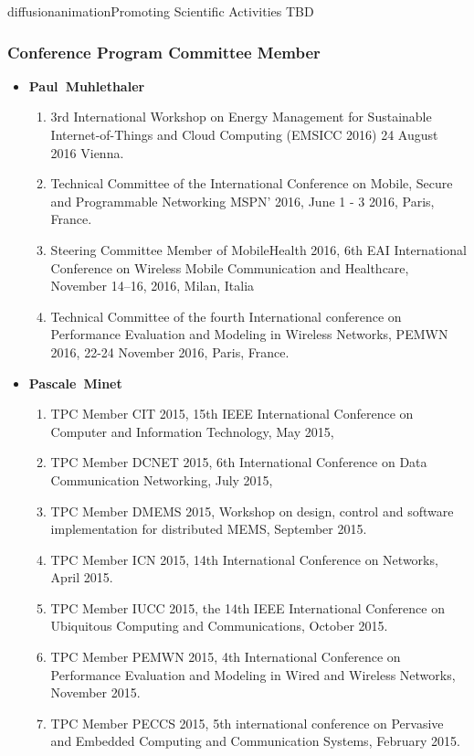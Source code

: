 \documentclass{ra2016}
\newcommand{\paul}  {\textbf{Paul~Muhlethaler}}
\newcommand{\pascale} {\textbf{Pascale~Minet}}
\begin{document}
\begin{module}{diffusion}{animation}{Promoting Scientific Activities}
TBD 

 \subsubsection {Conference Program Committee Member}

\begin{itemize}
    \item \paul
        \begin{enumerate}
             \item 3rd International Workshop on Energy Management for Sustainable Internet-of-Things and Cloud Computing (EMSICC 2016) 24 August 2016 Vienna. 
             \item Technical Committee of the International Conference on Mobile, Secure and Programmable Networking MSPN' 2016, June 1 - 3 2016, Paris, France. 
            \item Steering Committee Member of MobileHealth 2016, 6th  EAI International Conference on Wireless Mobile Communication and Healthcare,  November 14–16, 2016, Milan, Italia   
            \item Technical Committee of the fourth International conference on Performance Evaluation and Modeling in Wireless Networks, PEMWN 2016, 22-24 November 2016, Paris, France. 
        \end{enumerate}
    \item \pascale
        \begin{enumerate}
            \item TPC Member CIT 2015, 15th IEEE International Conference on Computer and Information Technology, May 2015,
            \item TPC Member DCNET 2015, 6th International Conference on Data Communication Networking, July 2015,
            \item TPC Member DMEMS 2015, Workshop on design, control and software implementation for distributed MEMS, September 2015.
            \item TPC Member ICN 2015, 14th International Conference on Networks, April 2015.
            \item TPC Member IUCC 2015, the 14th IEEE International Conference on Ubiquitous Computing and Communications, October 2015.
            \item TPC Member PEMWN 2015, 4th International Conference on Performance Evaluation and Modeling in Wired and Wireless Networks, November 2015.
            \item TPC Member PECCS 2015, 5th international conference on Pervasive and Embedded Computing and Communication Systems, February 2015.

\end{enumerate}
\end{itemize}
\end{module}
\end{document}
